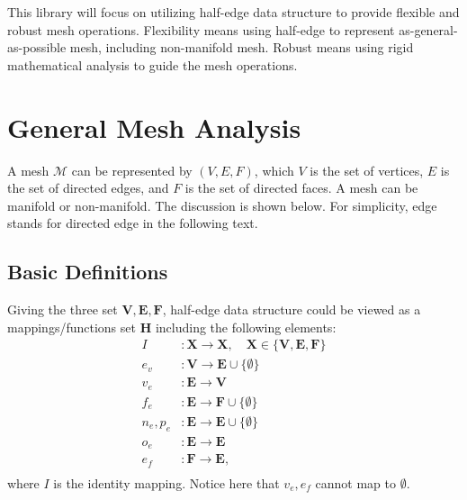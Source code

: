 \documentclass[9pt,twocolumn]{extarticle}
\newcommand{\SET}[1]{\mathbf{#1}}
\begin{document}
This library will focus on utilizing half-edge data structure to
provide flexible and robust mesh operations.  Flexibility means using
half-edge to represent as-general-as-possible mesh, including
non-manifold mesh.  Robust means using rigid mathematical analysis
to guide the mesh operations.

\section{General Mesh Analysis}

A mesh $\mathcal{M}$ can be represented by $(V,E,F)$, which $V$ is the
set of vertices, $E$ is the set of directed edges, and $F$ is the set
of directed faces. A mesh can be manifold or non-manifold.  The
discussion is shown below.  For simplicity, edge stands for directed
edge in the following text.

\subsection{Basic Definitions}




Giving the three set $\SET{V},\SET{E},\SET{F}$, half-edge data
structure could be viewed as a mappings/functions set $\SET{H}$
including the following elements:
\begin{equation}
  \begin{split}
    I &:\SET{X}\rightarrow \SET{X}, \quad \SET{X} \in \{\SET{V}, \SET{E}, \SET{F}\}\\
    e_v &: \SET{V}\rightarrow \SET{E}\cup\{\emptyset\}\\
    v_e &: \SET{E}\rightarrow \SET{V}\\
    f_e &: \SET{E}\rightarrow \SET{F}\cup\{\emptyset\}\\
    n_e, p_e &: \SET{E}\rightarrow \SET{E}\cup\{\emptyset\}\\
    o_e &: \SET{E}\rightarrow \SET{E}\\
    e_f &: \SET{F}\rightarrow \SET{E},\\
  \end{split}
\end{equation}
where $I$ is the identity mapping.  Notice here that $v_e, e_f$ cannot
map to $\emptyset$.
\end{document}
